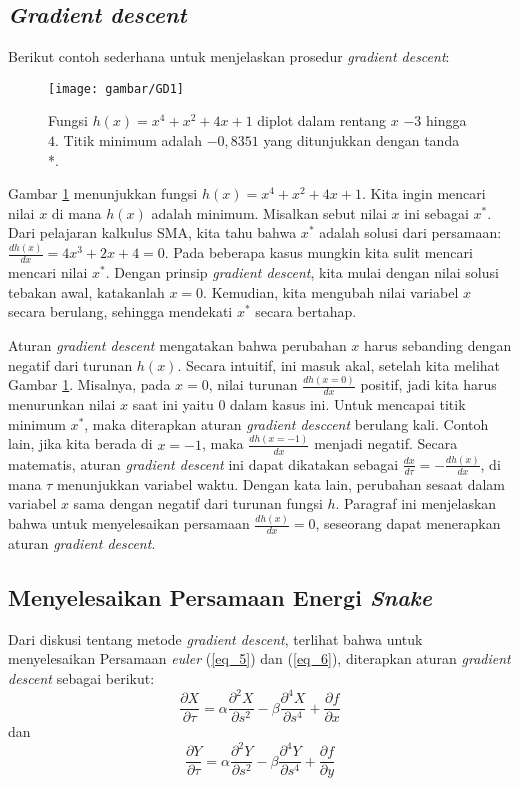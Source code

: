 \subsection{\emph{Gradient descent}}
Berikut contoh sederhana untuk menjelaskan prosedur \emph{gradient descent}:
\begin{figure}[H]
	\centering
	\texttt{[image: gambar/GD1]}
	\caption{Fungsi $h(x) = x^4 + x^2 + 4x + 1$ diplot dalam rentang $x$ $-3$ hingga $4$. Titik minimum adalah $-0,8351$ yang ditunjukkan dengan tanda *\citep{acton2007biomedical:19}.}
	\label{Gambar:gd1}
\end{figure}
Gambar \ref{Gambar:gd1} menunjukkan fungsi $h(x) = x^4 + x^2 + 4x + 1$. Kita ingin mencari nilai $x$ di mana $h (x)$ adalah minimum. Misalkan sebut nilai $x$ ini sebagai $x^*$. Dari pelajaran kalkulus SMA, kita tahu bahwa $x^*$ adalah solusi dari persamaan: $\frac{dh(x)}{dx} = 4x^3 + 2x + 4 = 0$. Pada beberapa kasus mungkin kita sulit mencari mencari nilai $x^*$. Dengan prinsip \emph{gradient descent}, kita mulai dengan nilai solusi tebakan awal, katakanlah $x = 0$. Kemudian, kita mengubah nilai variabel $x$ secara berulang, sehingga mendekati $x^*$ secara bertahap.

Aturan \emph{gradient descent} mengatakan bahwa perubahan $x$ harus sebanding dengan negatif dari turunan $h(x)$. Secara intuitif, ini masuk akal, setelah kita melihat Gambar \ref{Gambar:gd1}. Misalnya, pada $x = 0$, nilai turunan $\frac{dh (x = 0)}{dx}$ positif, jadi kita harus menurunkan nilai $x$ saat ini yaitu $0$ dalam kasus ini. Untuk mencapai titik minimum $x^*$, maka diterapkan aturan \emph{gradient desccent} berulang kali. Contoh lain, jika kita berada di $x = -1$, maka $\frac{dh (x = -1)}{dx}$ menjadi negatif. Secara matematis, aturan \emph{gradient descent} ini dapat dikatakan sebagai $\frac{dx}{d\tau} = - \frac{dh(x)}{dx}$, di mana $\tau$ menunjukkan variabel waktu. Dengan kata lain, perubahan sesaat dalam variabel $x$ sama dengan negatif dari turunan fungsi $h$. Paragraf ini menjelaskan bahwa untuk menyelesaikan persamaan $\frac{dh (x)}{dx}= 0$, seseorang dapat menerapkan aturan \emph{gradient descent}.

\subsection{Menyelesaikan Persamaan Energi \emph{Snake}}
Dari diskusi tentang metode \emph{gradient descent}, terlihat bahwa untuk menyelesaikan Persamaan \emph{euler} (\ref{eq_5}) dan (\ref{eq_6}), diterapkan aturan \emph{gradient descent} sebagai berikut\citep{acton2007biomedical:19}:
\begin{equation}
\label{eq_7}
\frac{\partial X}{\partial \tau} = \alpha \frac{\partial^2 X}{\partial s^2} - \beta \frac{\partial^4 X}{\partial s^4} + \frac{\partial f}{\partial x}
\end{equation}
dan
\begin{equation}
\label{eq_8}
\frac{\partial Y}{\partial \tau} = \alpha \frac{\partial^2 Y}{\partial s^2} - \beta \frac{\partial^4 Y}{\partial s^4} + \frac{\partial f}{\partial y}
\end{equation}

